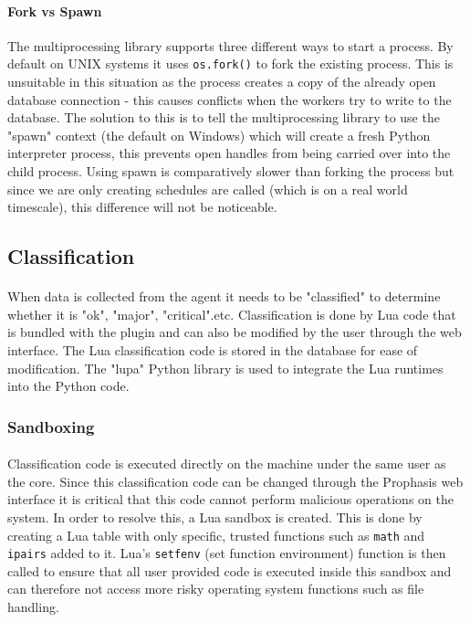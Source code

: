 \documentclass[bsc,logo,twoside,singlespacing]{infthesis}
\begin{document}
\paragraph*{Fork vs Spawn}
	The multiprocessing library supports three different ways to start a process.
	By default on UNIX systems it uses \texttt{os.fork()} to fork the existing
	process. This is unsuitable in this situation as the process creates a copy of
	the already open database connection - this causes conflicts when the workers
	try to write to the database.  The solution to this is to tell the
	multiprocessing library to use the "spawn" context (the default on Windows)
	which will create a fresh Python interpreter process, this prevents open
	handles from being carried over into the child process. Using spawn is
	comparatively slower than forking the process but since we are only creating
	schedules are called (which is on a real world timescale), this difference will
	not be noticeable.

\subsection{Classification}
\paragraph*{}
	When data is collected from the agent it needs to be "classified" to determine
	whether it is "ok", "major", "critical".etc.  Classification is done by Lua
	code that is bundled with the plugin and can also be modified by the user
	through the web interface.  The Lua classification code is stored in the
	database for ease of modification.  The "lupa" Python library is used to
	integrate the Lua runtimes into the Python code.

\subsubsection{Sandboxing}
\label{classification_sandboxing}
\paragraph*{}
	Classification code is executed directly on the machine under the same user as
	the core.  Since this classification code can be changed through the Prophasis
	web interface it is critical that this code cannot perform malicious operations
	on the system.  In order to resolve this, a Lua sandbox is created.  This is
	done by creating a Lua table with only specific, trusted functions such as
	\texttt{math} and \texttt{ipairs} added to it.  Lua's \texttt{setfenv} (set
	function environment) function is then called to ensure that all user provided
	code is executed inside this sandbox and can therefore not access more risky
	operating system functions such as file handling.
\end{document}
